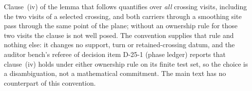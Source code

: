 \begin{remark}\label{rem:selected-visits}
Clause~(iv) of the lemma that follows quantifies over \emph{all} crossing
visits, including the two visits of a selected crossing, and both carriers
through a smoothing site pass through the same point of the plane; without
an ownership rule for those two visits the clause is not well posed. The
convention supplies that rule and nothing else: it changes no support, turn
or retained-crossing datum, and the auditor bench's referee of decision item
D-25-1 (phase ledger) reports that clause~(iv) holds under either ownership
rule on its finite test set, so the choice is a disambiguation, not a
mathematical commitment. The main text has no counterpart of this
convention.
\end{remark}

